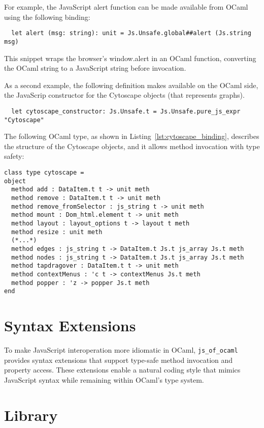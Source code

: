 For example, the JavaScript alert function can be made available from OCaml using the following binding:
\begin{verbatim}
  let alert (msg: string): unit = Js.Unsafe.global##alert (Js.string msg)
\end{verbatim}

This snippet wraps the browser's window.alert in an OCaml function, converting the
OCaml string to a JavaScript string before invocation.

As a second example, the following definition makes available on the OCaml side, the JavaScrip constructor for the Cytoscape objects (that represents graphs).

\begin{verbatim}
  let cytoscape_constructor: Js.Unsafe.t = Js.Unsafe.pure_js_expr "Cytoscape"
\end{verbatim}

The following OCaml type, as shown in Listing~\ref{lst:cytoscape_binding}, describes the structure of the Cytoscape objects, and it allows method invocation with type safety:

\begin{lstlisting}[caption={Binding for Cytoscape object}, label={lst:cytoscape_binding}]
class type cytoscape =
object
  method add : DataItem.t t -> unit meth
  method remove : DataItem.t t -> unit meth
  method remove_fromSelector : js_string t -> unit meth
  method mount : Dom_html.element t -> unit meth
  method layout : layout_options t -> layout t meth
  method resize : unit meth
  (*...*)
  method edges : js_string t -> DataItem.t Js.t js_array Js.t meth
  method nodes : js_string t -> DataItem.t Js.t js_array Js.t meth
  method tapdragover : DataItem.t t -> unit meth
  method contextMenus : 'c t -> contextMenus Js.t meth
  method popper : 'z -> popper Js.t meth
end
\end{lstlisting}

\section*{Syntax Extensions}

To make JavaScript interoperation more idiomatic in OCaml, 
\texttt{js\_of\_ocaml} provides syntax extensions that support type-safe method invocation and property access. 
These extensions enable a natural coding style that mimics JavaScript syntax while remaining within OCaml's type system.

\section*{Library}

